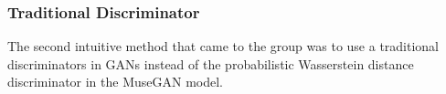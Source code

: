 \begin{par}
        \subsubsection{Traditional Discriminator} %
        \label{ssub:Traditional Discriminator}
            \par The second intuitive method that came to the group was to use a traditional discriminators in GANs \cite{generative} instead of the probabilistic Wasserstein distance discriminator in the MuseGAN model. 

    

\end{par}
